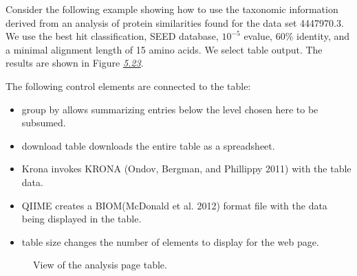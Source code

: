 \documentclass[letterpaper,10pt,english]{sphinxmanual}
\begin{document}
Consider the following example showing how to use the taxonomic
information derived from an analysis of protein similarities found for
the data set 4447970.3. We use the best hit classification, SEED
database, \(10^{-5}\) evalue, 60\% identity, and a minimal alignment
length of 15 amino acids. We select table output. The results are shown
in Figure {\hyperref[\detokenize{user_manual:fig:analysis-page-table}]{\emph{5.23}}}.

The following control elements are connected to the table:
\begin{itemize}
\item {} 
group by \textendash{} allows summarizing entries below the level chosen here to
be subsumed.

\item {} 
download table \textendash{} downloads the entire table as a spreadsheet.

\item {} 
Krona \textendash{} invokes KRONA (Ondov, Bergman, and Phillippy 2011) with the
table data.

\item {} 
QIIME \textendash{} creates a BIOM(McDonald et al. 2012) format file with the
data being displayed in the table.

\item {} 
table size \textendash{} changes the number of elements to display for the web
page.

\end{itemize}

\begin{figure}[htbp]
\centering
\capstart

\noindent{}
\caption{View of the analysis page table.}\label{\detokenize{user_manual:fig-analysis-page-table}}\end{figure}
\end{document}

